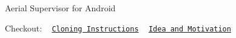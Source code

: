 Aerial Supervisor for Android

Checkout\+: ~\newline
 \href{https://github.com/LSTS/ASA/wiki/Cloning-Instructions}{\tt Cloning Instructions} ~\newline
 \href{https://github.com/LSTS/ASA/wiki/Idea-and-Motivation}{\tt Idea and Motivation} 